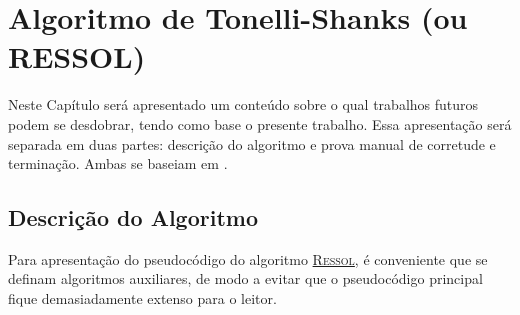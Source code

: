 \chapter{Algoritmo de Tonelli-Shanks (ou RESSOL)}
\label{cap:tonelli-shanks}

Neste Capítulo será apresentado um conteúdo sobre o qual trabalhos futuros podem se desdobrar, tendo como base o presente trabalho. Essa apresentação será separada em duas partes: descrição do algoritmo e prova manual de corretude e terminação. Ambas se baseiam em \cite{Huynh1581080}.

\section{Descrição do Algoritmo}
Para apresentação do pseudocódigo do algoritmo \hyperref[algo:ressol]{\textsc{Ressol}}, é conveniente que se definam algoritmos auxiliares, de modo a evitar que o pseudocódigo principal fique demasiadamente extenso para o leitor.

